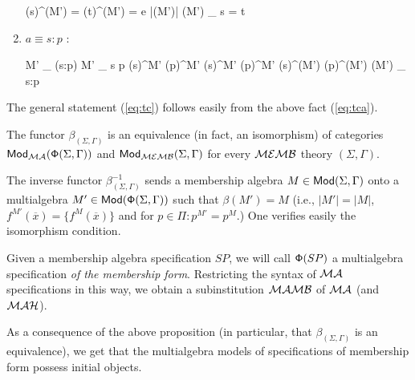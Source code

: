 \documentclass[10pt]{article}
\begin{document}
\begin{PROOF}
\begin{enumerate}
\begin{eqp}
			{\nu}(s)^{\beta(M')} = {\nu}(t)^{\beta(M')} = e \in |\beta(M')|
			{\beta(M')} \models_{\nu} s = t
		\end{eqp}
\item $a\equiv s:p$ :
		\begin{eqp}
			M' \models_{\nu} \alpha(s:p)
			M' \models_{\nu} s \prec p
			{\nu}(s)^{M'} \subseteq {\nu}(p)^{M'}
			{\nu}(s)^{M'} \in {\nu}(p)^{M'}
			{\nu}(s)^{\beta(M')} \in {\nu}(p)^{\beta(M')}
			{\beta(M')} \models_{\nu} s:p
		\end{eqp}
	\end{enumerate}
The general statement (\ref{eq:tc}) follows easily from the above fact (\ref{eq:tca}).
\end{PROOF}

\begin{fact}
The functor $\beta_{(\Sigma,\Gamma)}$ is an equivalence (in fact, an
isomorphism) of categories ${\sf {Mod}}_{{\mathcal{MA}}}({\sf {\Phi}}(\Sigma,\Gamma))$ and
${\sf {Mod}}_{{\mathcal{MEMB}}}(\Sigma,\Gamma)$ for
every ${\mathcal{MEMB}}$ theory $(\Sigma,\Gamma)$. 
\end{fact}
%
\begin{PROOF}
The inverse functor
$\beta^{-1}_{(\Sigma,\Gamma)}$ sends a membership algebra
$M\in{\sf {Mod}}(\Sigma,\Gamma)$ onto a multialgebra
$M'\in{\sf {Mod}}({\sf {\Phi}}(\Sigma,\Gamma))$ such that $\beta(M')=M$ (i.e., $|M'|=|M|$,
$f^{M'}(\overline x) = \{f^M(\overline x)\}$ and for $p\in\Pi:p^{M'}=p^M$.)
One verifies easily the isomorphism condition.
\end{PROOF}
%
Given a membership algebra specification $SP$, we will call ${\sf {\Phi}}(SP)$ a
multialgebra specification {\em of the membership form}. Restricting the syntax
of ${\mathcal{MA}}$ specifications in this way, we obtain a 
subinstitution ${\mathcal{MAMB}}$ of ${\mathcal{MA}}$ (and ${\mathcal{MAH}}$).

As a consequence of the above proposition (in particular, that
$\beta_{(\Sigma,\Gamma)}$ is an equivalence), we get that the multialgebra
models of specifications of membership form possess initial objects. 
\end{document}
